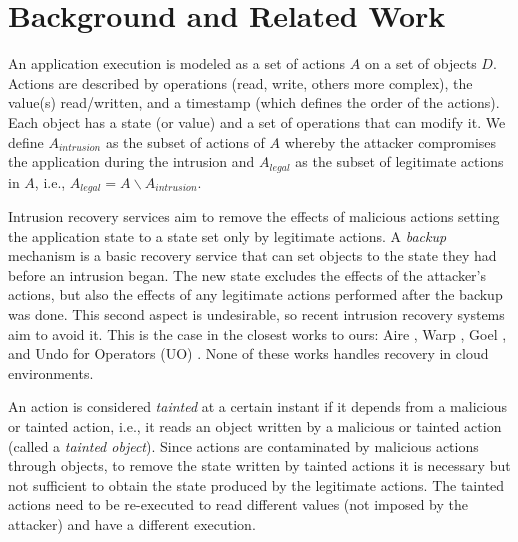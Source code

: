 
\section{Background and Related Work}\label{sec:background}
An application execution is modeled as a set of actions $A$ on a set of objects $D$. Actions are described by operations (read, write, others more complex), the value(s) read/written, and a timestamp (which defines the order of the actions). Each object has a state (or value) and a set of operations that can modify it. We define $A_{intrusion}$ as the subset of actions of $A$ whereby the attacker compromises the application during the intrusion and $A_{legal}$ as the subset of legitimate actions in $A$, i.e., $A_{legal} = A \backslash A_{intrusion}$.

Intrusion recovery services aim to remove the effects of malicious actions setting the application state to a state set only by legitimate actions. 
%
A \textit{backup} mechanism is a basic recovery service that can set objects to the state they had before an intrusion began. The new state excludes the effects of the attacker's actions, but also the effects of any legitimate actions performed after the backup was done. This second aspect is undesirable, so recent intrusion recovery systems aim to avoid it. This is the case in the closest works to ours: Aire \cite{aire}, Warp \cite{warp}, Goel \cite{Akkus2010}, and Undo for Operators (UO) \cite{undoForOperators}. None of these works handles recovery in cloud environments.

An action is considered \textit{tainted} at a certain instant if it depends from a malicious or tainted action, i.e., it reads an object written by a malicious or tainted action (called a \textit{tainted object}). Since actions are contaminated by malicious actions through objects, to remove the state written by tainted actions it is necessary but not sufficient to obtain the state produced by the legitimate actions. The tainted actions need to be re-executed to read different values (not imposed by the attacker) and have a different execution. 


